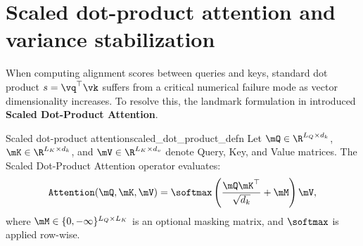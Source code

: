 \documentclass[../../main.tex]{subfiles}
\begin{document}
\section{Scaled dot-product attention and variance stabilization}
\label{sec:scaled_dot_product_attention}

When computing alignment scores between queries and keys, standard dot product $s = \vq^\top \vk$ suffers from a critical numerical failure mode as vector dimensionality increases. To resolve this, the landmark formulation in \cite{vaswani2017} introduced \textbf{Scaled Dot-Product Attention}.

\begin{definition}{Scaled dot-product attention}{scaled_dot_product_defn}
Let $\mQ \in \R^{L_Q \times d_k}$, $\mK \in \R^{L_K \times d_k}$, and $\mV \in \R^{L_K \times d_v}$ denote Query, Key, and Value matrices. The Scaled Dot-Product Attention operator evaluates:
\begin{equation}
\label{eq:scaled_dot_product_matrix}
\text{\texttt{Attention}}(\mQ, \mK, \mV) = \softmax\left( \frac{\mQ \mK^\top}{\sqrt{d_k}} + \mM \right) \mV,
\end{equation}
where $\mM \in \{0, -\infty\}^{L_Q \times L_K}$ is an optional masking matrix, and $\softmax$ is applied row-wise.
\end{definition}
\end{document}
